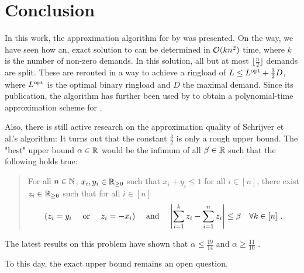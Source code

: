 \section{Conclusion}

In this work, the approximation algorithm for \RL by \citet{schrijver99} was presented.
On the way, we have seen how an, exact solution to \RRL can be determined in $\mathcal{O}(k n^2)$ time, where $k$ is the number of non-zero demands.
In this solution, all but at most $\lfloor \frac{n}{2} \rfloor$ demands are split.
These are rerouted in a way to achieve a ringload of $L \leq L^{\mathrm{opt}} + \frac{3}{2}D$, where $L^{\mathrm{opt}}$ is the optimal binary ringload and $D$ the maximal demand.
Since its publication, the algorithm has further been used by \citet{khanna97} to obtain a polynomial-time approximation scheme for \RL.

Also, there is still active research on the approximation quality of Schrijver et al.'s algorithm:
It turns out that the constant $\frac{3}{2}$ is only a rough upper bound.
The "best" upper bound $\alpha \in \mathbb{R}$ would be the infimum of all $\beta \in \mathbb{R}$ such that the following holds true:
\begin{quote}
	For all $n \in \mathbb{N}$, $x_i, y_i \in \mathbb{R}_{\geq 0}$ such that $x_i + y_i \leq 1$ for all $i \in [n]$, there exist $z_i \in \mathbb{R}_{\geq 0}$ such that for all $i \in [n]$
	\begin{equation}
		(z_i = y_i \quad \text{ or } \quad z_i = -x_i) 
		\quad \text{ and } \quad \abs{\sum_{i=1}^k z_i - \sum_{i = 1}^n z_i} \leq \beta \quad \forall k \in [n] \ .
	\end{equation}
\end{quote}
The latest results on this problem have shown that $\alpha \leq \frac{19}{14}$ and $\alpha \geq \frac{11}{10}$ \cite{skutella16, daubel19}.


To this day, the exact upper bound remains an open question.